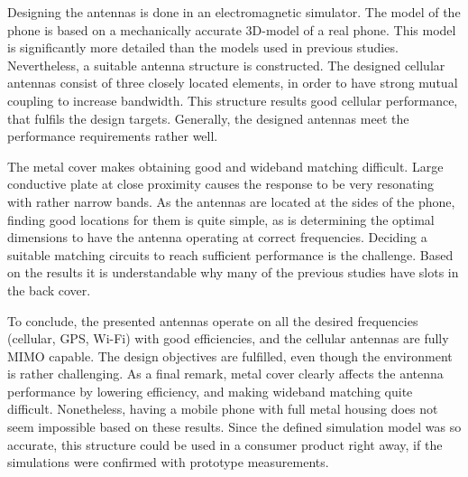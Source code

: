 Designing the antennas is done in an electromagnetic simulator. The model of the phone is based on a mechanically accurate 3D-model of a real phone. This model is significantly more detailed than the models used in previous studies. Nevertheless, a suitable antenna structure is constructed. The designed cellular antennas consist of three closely located elements, in order to have strong mutual coupling to increase bandwidth. This structure results good cellular performance, that fulfils the design targets. Generally, the designed antennas meet the performance requirements rather well.

The metal cover makes obtaining good and wideband matching difficult. Large conductive plate at close proximity causes the response to be very resonating with rather narrow bands. As the antennas are located at the sides of the phone, finding good locations for them is quite simple, as is determining the optimal dimensions to have the antenna operating at correct frequencies. Deciding a suitable matching circuits to reach sufficient performance is the challenge. Based on the results it is understandable why many of the previous studies have slots in the back cover.


To conclude, the presented antennas operate on all the desired frequencies (cellular, GPS, Wi-Fi) with good efficiencies, and the cellular antennas are fully MIMO capable. The design objectives are fulfilled, even though the environment is rather challenging. As a final remark, metal cover clearly affects the antenna performance by lowering efficiency, and making wideband matching quite difficult. Nonetheless, having a mobile phone with full metal housing does not seem impossible based on these results. Since the defined simulation model was so accurate, this structure could be used in a consumer product right away, if the simulations were confirmed with prototype measurements.


\clearpage